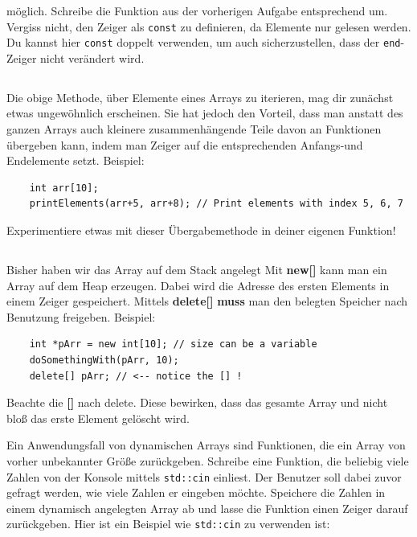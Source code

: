 möglich.
Schreibe die Funktion aus der vorherigen Aufgabe entsprechend um.
Vergiss nicht, den Zeiger als \texttt{const} zu definieren, da Elemente nur gelesen werden.
Du kannst hier \texttt{const} doppelt verwenden, um auch sicherzustellen, dass der \texttt{end}-Zeiger nicht verändert wird.

\subsection{}
Die obige Methode, über Elemente eines Arrays zu iterieren, mag dir zunächst etwas ungewöhnlich erscheinen.
Sie hat jedoch den Vorteil, dass man anstatt des ganzen Arrays auch kleinere zusammenhängende Teile davon an Funktionen übergeben kann, indem man Zeiger auf die entsprechenden Anfangs-und Endelemente setzt.
Beispiel:

\begin{lstlisting}
	int arr[10];
	printElements(arr+5, arr+8); // Print elements with index 5, 6, 7
\end{lstlisting}

Experimentiere etwas mit dieser Übergabemethode in deiner eigenen Funktion!

\subsection{}
Bisher haben wir das Array auf dem Stack angelegt
Mit \textbf{new[]} kann man ein Array auf dem Heap erzeugen.
Dabei wird die Adresse des ersten Elements in einem Zeiger gespeichert.
Mittels \textbf{delete[]} \textbf{muss} man den belegten Speicher nach Benutzung freigeben.
Beispiel:

\begin{lstlisting}
	int *pArr = new int[10]; // size can be a variable
	doSomethingWith(pArr, 10);
	delete[] pArr; // <-- notice the [] !
\end{lstlisting}

Beachte die \textbf{[]} nach delete.
Diese bewirken, dass das gesamte Array und nicht bloß das erste Element gelöscht wird.

Ein Anwendungsfall von dynamischen Arrays sind Funktionen, die ein Array von vorher unbekannter Größe zurückgeben.
Schreibe eine Funktion, die beliebig viele Zahlen von der Konsole mittels \texttt{std::cin} einliest.
Der Benutzer soll dabei zuvor gefragt werden, wie viele Zahlen er eingeben möchte.
Speichere die Zahlen in einem dynamisch angelegten Array ab und lasse die Funktion einen Zeiger darauf zurückgeben.
Hier ist ein Beispiel wie \texttt{std::cin} zu verwenden ist:

